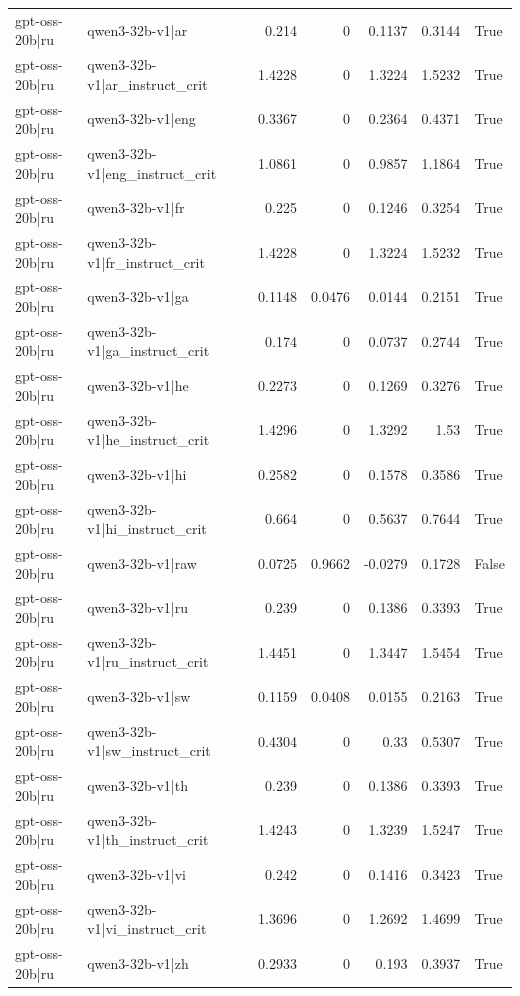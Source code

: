 \begin{table}
\begin{tabular}{l l r r r r l}
gpt-oss-20b|ru & qwen3-32b-v1|ar & 0.214 & 0 & 0.1137 & 0.3144 & True \\
gpt-oss-20b|ru & qwen3-32b-v1|ar_instruct_crit & 1.4228 & 0 & 1.3224 & 1.5232 & True \\
gpt-oss-20b|ru & qwen3-32b-v1|eng & 0.3367 & 0 & 0.2364 & 0.4371 & True \\
gpt-oss-20b|ru & qwen3-32b-v1|eng_instruct_crit & 1.0861 & 0 & 0.9857 & 1.1864 & True \\
gpt-oss-20b|ru & qwen3-32b-v1|fr & 0.225 & 0 & 0.1246 & 0.3254 & True \\
gpt-oss-20b|ru & qwen3-32b-v1|fr_instruct_crit & 1.4228 & 0 & 1.3224 & 1.5232 & True \\
gpt-oss-20b|ru & qwen3-32b-v1|ga & 0.1148 & 0.0476 & 0.0144 & 0.2151 & True \\
gpt-oss-20b|ru & qwen3-32b-v1|ga_instruct_crit & 0.174 & 0 & 0.0737 & 0.2744 & True \\
gpt-oss-20b|ru & qwen3-32b-v1|he & 0.2273 & 0 & 0.1269 & 0.3276 & True \\
gpt-oss-20b|ru & qwen3-32b-v1|he_instruct_crit & 1.4296 & 0 & 1.3292 & 1.53 & True \\
gpt-oss-20b|ru & qwen3-32b-v1|hi & 0.2582 & 0 & 0.1578 & 0.3586 & True \\
gpt-oss-20b|ru & qwen3-32b-v1|hi_instruct_crit & 0.664 & 0 & 0.5637 & 0.7644 & True \\
gpt-oss-20b|ru & qwen3-32b-v1|raw & 0.0725 & 0.9662 & -0.0279 & 0.1728 & False \\
gpt-oss-20b|ru & qwen3-32b-v1|ru & 0.239 & 0 & 0.1386 & 0.3393 & True \\
gpt-oss-20b|ru & qwen3-32b-v1|ru_instruct_crit & 1.4451 & 0 & 1.3447 & 1.5454 & True \\
gpt-oss-20b|ru & qwen3-32b-v1|sw & 0.1159 & 0.0408 & 0.0155 & 0.2163 & True \\
gpt-oss-20b|ru & qwen3-32b-v1|sw_instruct_crit & 0.4304 & 0 & 0.33 & 0.5307 & True \\
gpt-oss-20b|ru & qwen3-32b-v1|th & 0.239 & 0 & 0.1386 & 0.3393 & True \\
gpt-oss-20b|ru & qwen3-32b-v1|th_instruct_crit & 1.4243 & 0 & 1.3239 & 1.5247 & True \\
gpt-oss-20b|ru & qwen3-32b-v1|vi & 0.242 & 0 & 0.1416 & 0.3423 & True \\
gpt-oss-20b|ru & qwen3-32b-v1|vi_instruct_crit & 1.3696 & 0 & 1.2692 & 1.4699 & True \\
gpt-oss-20b|ru & qwen3-32b-v1|zh & 0.2933 & 0 & 0.193 & 0.3937 & True \\

\end{tabular}
\end{table}
